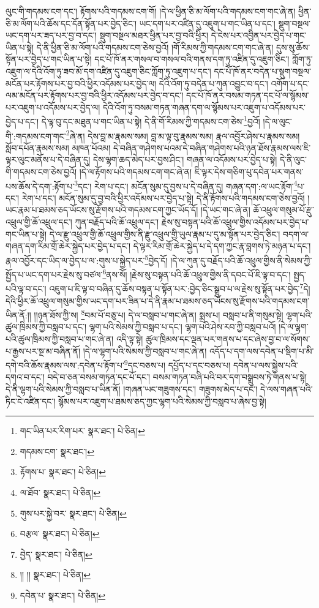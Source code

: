 ལུང་གི་གདམས་ངག་དང་། རྟོགས་པའི་གདམས་ངག་གོ། །དེ་ལ་ཕྱིན་ཅི་མ་ལོག་པའི་གདམས་ངག་གང་ཞེ་ན། ཕྱིན་ཅི་མ་ལོག་པའི་ཆོས་དང་དོན་སྟོན་པར་བྱེད་ཅིང་། ཡང་དག་པར་འཛིན་དུ་འཇུག་པ་གང་ཡིན་པ་དང་། སྡུག་བསྔལ་ཡང་དག་པར་ཟད་པར་བྱ་བ་དང་། སྡུག་བསྔལ་མཐར་ཕྱིན་པར་བྱ་བའི་ཕྱིར། དེ་ངེས་པར་འབྱིན་པར་བྱེད་པ་གང་ཡིན་པ་སྟེ། དེ་ནི་ཕྱིན་ཅི་མ་ལོག་པའི་གདམས་ངག་ཅེས་བྱའོ། །གོ་རིམས་ཀྱི་གདམས་ངག་གང་ཞེ་ན། དུས་སུ་ཆོས་སྟོན་པར་བྱེད་པ་གང་ཡིན་པ་སྟེ། དང་པོ་ཁོ་ནར་གསལ་བ་གསལ་བའི་གནས་དག་ཏུ་འཛིན་དུ་འཇུག་ཅིང་། ཀློག་ཏུ་འཇུག་ལ་དེའི་འོག་ཏུ་ཟབ་མོ་དག་འཛིན་དུ་འཇུག་ཅིང་ཀློག་ཏུ་འཇུག་པ་དང་། དང་པོ་ཁོ་ནར་བདེན་པ་སྡུག་བསྔལ་མངོན་པར་རྟོགས་པར་བྱ་བའི་ཕྱིར་འདོམས་པར་བྱེད་ལ། དེའི་འོག་ཏུ་བདེན་པ་ཀུན་འབྱུང་བ་དང་། འགོག་པ་དང་ལམ་མངོན་པར་རྟོགས་པར་བྱ་བའི་ཕྱིར་འདོམས་པར་བྱེད་བ་དང་། དང་པོ་ཁོ་ནར་བསམ་གཏན་དང་པོ་ལ་སྙོམས་པར་འཇུག་པ་འདོམས་པར་བྱེད་ལ། དེའི་འོག་ཏུ་བསམ་གཏན་གཞན་དག་ལ་སྙོམས་པར་འཇུག་པ་འདོམས་པར་བྱེད་པ་དང་། དེ་ལྟ་བུ་དང་མཐུན་པ་གང་ཡིན་པ་སྟེ། དེ་ནི་གོ་རིམས་ཀྱི་གདམས་ངག་ཅེས་\footnote{གང་ཡིན་པར་རིག་པར་  སྣར་ཐང་།  པེ་ཅིན། }བྱའོ། །དེ་ལ་ལུང་གི་:གདམས་ངག་གང་\footnote{གདམས་ངག་  སྣར་ཐང་། }ཞེ་ན། དེས་བླ་མ་རྣམས་སམ། བླ་མ་ལྟ་བུ་རྣམས་སམ། རྣལ་འབྱོར་ཤེས་པ་རྣམས་སམ། སློབ་དཔོན་རྣམས་སམ། མཁན་པོའམ། དེ་བཞིན་གཤེགས་པའམ་དེ་བཞིན་གཤེགས་པའི་ཉན་ཐོས་རྣམས་ལས་ཇི་ལྟར་ལུང་མནོས་པ་དེ་བཞིན་དུ། དེས་ལྷག་ཆད་མེད་པར་བྱས་ཤིང་། གཞན་ལ་འདོམས་པར་བྱེད་པ་སྟེ། དེ་ནི་ལུང་གི་གདམས་ངག་ཅེས་བྱའོ། །དེ་ལ་རྟོགས་པའི་གདམས་ངག་གང་ཞེ་ན། ཇི་ལྟར་དེས་གཅིག་པུ་དབེན་པར་གནས་པས་ཆོས་དེ་དག་:རྟོག་པ་\footnote{རྟོགས་པ་  སྣར་ཐང་།  པེ་ཅིན། }དང་། རེག་པ་དང་། མངོན་སུམ་དུ་བྱས་པ་དེ་བཞིན་དུ། གཞན་དག་:ལ་ཡང་རྟོག་\footnote{ལ་ཐོབ་  སྣར་ཐང་།  པེ་ཅིན། }པ་དང་། རེག་པ་དང་། མངོན་སུམ་དུ་བྱ་བའི་ཕྱིར་འདོམས་པར་བྱེད་པ་སྟེ། དེ་ནི་རྟོགས་པའི་གདམས་ངག་ཅེས་བྱའོ། །ཡང་རྣམ་པ་ཐམས་ཅད་ཡོངས་སུ་རྫོགས་པའི་གདམས་ངག་ཀྱང་ཡོད་དོ། །དེ་ཡང་གང་ཞེ་ན། ཆོ་འཕྲུལ་གསུམ་པོ་རྫུ་འཕྲུལ་གྱི་ཆོ་འཕྲུལ་དང་། ཀུན་བརྗོད་པའི་ཆོ་འཕྲུལ་དང་། རྗེས་སུ་བསྟན་པའི་ཆོ་འཕྲུལ་གྱིས་འདོམས་པར་བྱེད་པ་གང་ཡིན་པ་སྟེ། དེ་ལ་རྫུ་འཕྲུལ་གྱི་ཆོ་འཕྲུལ་གྱིས་ནི་རྫུ་འཕྲུལ་གྱི་ཡུལ་རྣམ་པ་དུ་མ་སྟོན་པར་བྱེད་ཅིང་། བདག་ལ་གཞན་དག་རིམ་གྲོ་ཆེར་སྐྱེད་པར་བྱེད་པ་དང་། དེ་ལྟར་རིམ་གྲོ་ཆེར་སྐྱེད་པ་དེ་དག་ཀྱང་རྣ་བླགས་ཏེ་མཉན་པ་དང་། རྣལ་འབྱོར་དང་ཡིད་ལ་བྱེད་པ་ལ་:གུས་པ་སྐྱེད་པར་\footnote{གུས་པར་སྐྱེ་བར་  སྣར་ཐང་།  པེ་ཅིན། }བྱེད་དོ། །དེ་ལ་ཀུན་དུ་བརྗོད་པའི་ཆོ་འཕྲུལ་གྱིས་ནི་སེམས་ཀྱི་སྤྱོད་པ་ཡང་དག་པར་རྗེས་སུ་བཙལ་\footnote{བརྩལ་  སྣར་ཐང་།  པེ་ཅིན། }ནས་སོ། །རྗེས་སུ་བསྟན་པའི་ཆོ་འཕྲུལ་གྱིས་ནི་དབང་པོ་ཇི་ལྟ་བ་དང་། སྤྱད་པའི་ལྟ་བ་དང་། འཇུག་པ་ཇི་ལྟ་བ་བཞིན་དུ་ཆོས་བསྟན་པ་སྟོན་པར་:བྱེད་ཅིང་སྒྲུབ་པ་ལ་རྗེས་སུ་སྟོན་པར་བྱེད་\footnote{བྱེད་  སྣར་ཐང་།  པེ་ཅིན། }དེ། དེའི་ཕྱིར་ཆོ་འཕྲུལ་གསུམ་གྱིས་ཡང་དག་པར་ཟིན་པ་དེ་ནི་རྣམ་པ་ཐམས་ཅད་ཡོངས་སུ་རྫོགས་པའི་གདམས་ངག་ཡིན་ནོ:།། །།ཉན་ཐོས་ཀྱི་ས། \footnote{།། །།   སྣར་ཐང་།  པེ་ཅིན། }བམ་པོ་བཅུ་པ། དེ་ལ་བསླབ་པ་གང་ཞེ་ན། སྨྲས་པ། བསླབ་པ་ནི་གསུམ་སྟེ། ལྷག་པའི་ཚུལ་ཁྲིམས་ཀྱི་བསླབ་པ་དང་། ལྷག་པའི་སེམས་ཀྱི་བསླབ་པ་དང་། ལྷག་པའི་ཤེས་རབ་ཀྱི་བསླབ་པའོ། །དེ་ལ་ལྷག་པའི་ཚུལ་ཁྲིམས་ཀྱི་བསླབ་པ་གང་ཞེ་ན། འདི་ལྟ་སྟེ། ཚུལ་ཁྲིམས་དང་ལྡན་པར་གནས་པ་དང་ཞེས་བྱ་བ་ལ་སོགས་པ་རྒྱས་པར་སྔ་མ་བཞིན་ནོ། །དེ་ལ་ལྷག་པའི་སེམས་ཀྱི་བསླབ་པ་གང་ཞེ་ན། འདོད་པ་དག་ལས་དབེན་པ་སྡིག་པ་མི་དགེ་བའི་ཆོས་རྣམས་ལས་:དབེན་པ་རྟོག་པ་\footnote{དབེན་པ་  སྣར་ཐང་།  པེ་ཅིན། }དང་བཅས་པ། དཔྱོད་པ་དང་བཅས་པ། དབེན་པ་ལས་སྐྱེས་པའི་དགའ་བ་དང་། བདེ་བ་ཅན་བསམ་གཏན་དང་པོ་དང་། བསམ་གཏན་བཞི་པའི་བར་དག་བསྒྲུབས་ཏེ་གནས་པ་སྟེ། དེ་ནི་ལྷག་པའི་སེམས་ཀྱི་བསླབ་པ་ཡིན་ནོ། །གཞན་ཡང་གཟུགས་དང་། གཟུགས་མེད་པ་དང་། དེ་ལས་གཞན་པའི་ཏིང་ངེ་འཛིན་དང་། སྙོམས་པར་འཇུག་པ་ཐམས་ཅད་ཀྱང་ལྷག་པའི་སེམས་ཀྱི་བསླབ་པ་ཞེས་བྱ་སྟེ། 